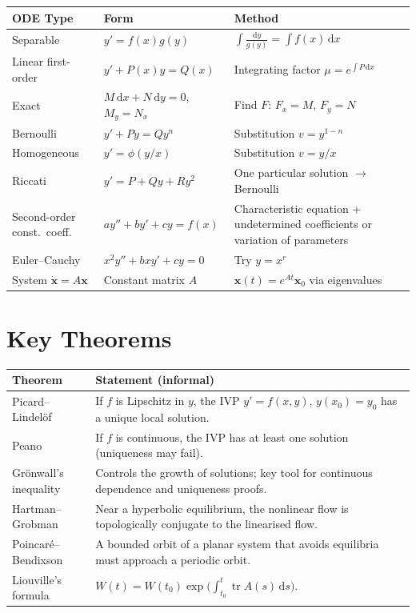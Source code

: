 \documentclass[12pt,a4paper,openany]{book}
\theoremstyle{definition}
\theoremstyle{plain}
\theoremstyle{remark}
\newcommand{\dd}{\mathrm{d}}
\DeclareMathOperator{\tr}{tr}
\begin{document}
\begin{center}
\begin{tabular}{@{}p{4.5cm}p{4cm}p{5.5cm}@{}}
\toprule
\textbf{ODE Type} & \textbf{Form} & \textbf{Method} \\
\midrule
Separable &
  $y'=f(x)g(y)$ &
  $\displaystyle\int\frac{\dd y}{g(y)}=\int f(x)\,\dd x$ \\[6pt]
Linear first-order &
  $y'+P(x)y=Q(x)$ &
  Integrating factor $\mu=e^{\int P\,\dd x}$ \\[6pt]
Exact &
  $M\,\dd x+N\,\dd y=0$, $M_{y}=N_{x}$ &
  Find $F$: $F_{x}=M$, $F_{y}=N$ \\[6pt]
Bernoulli &
  $y'+Py=Qy^{n}$ &
  Substitution $v=y^{1-n}$ \\[6pt]
Homogeneous &
  $y'=\phi(y/x)$ &
  Substitution $v=y/x$ \\[6pt]
Riccati &
  $y'=P+Qy+Ry^{2}$ &
  One particular solution $\to$ Bernoulli \\[6pt]
Second-order const.\ coeff. &
  $ay''+by'+cy=f(x)$ &
  Characteristic equation + undetermined coefficients or variation of parameters \\[6pt]
Euler--Cauchy &
  $x^{2}y''+bxy'+cy=0$ &
  Try $y=x^{r}$ \\[6pt]
System $\dot{\mathbf{x}}=A\mathbf{x}$ &
  Constant matrix $A$ &
  $\mathbf{x}(t)=e^{At}\mathbf{x}_{0}$ via eigenvalues \\
\bottomrule
\end{tabular}
\end{center}

\section*{Key Theorems}

\begin{center}
\begin{tabular}{@{}p{4.5cm}p{9.5cm}@{}}
\toprule
\textbf{Theorem} & \textbf{Statement (informal)} \\
\midrule
Picard--Lindel\"of &
  If $f$ is Lipschitz in $y$, the IVP $y'=f(x,y)$, $y(x_{0})=y_{0}$
  has a unique local solution. \\[4pt]
Peano &
  If $f$ is continuous, the IVP has at least one solution (uniqueness
  may fail). \\[4pt]
Gr\"onwall's inequality &
  Controls the growth of solutions; key tool for continuous dependence
  and uniqueness proofs. \\[4pt]
Hartman--Grobman &
  Near a hyperbolic equilibrium, the nonlinear flow is topologically
  conjugate to the linearised flow. \\[4pt]
Poincar\'e--Bendixson &
  A bounded orbit of a planar system that avoids equilibria must
  approach a periodic orbit. \\[4pt]
Liouville's formula &
  $W(t)=W(t_{0})\exp\!\bigl(\int_{t_0}^{t}\tr A(s)\,\dd s\bigr)$. \\
\bottomrule
\end{tabular}
\end{center}
\end{document}

